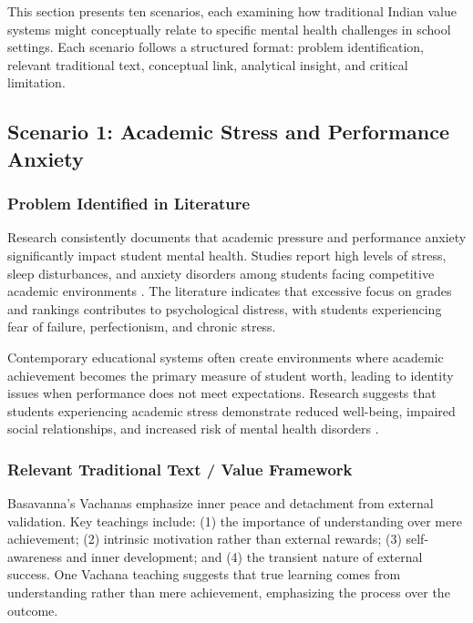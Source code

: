 \documentclass[12pt,a4paper,twocolumn]{article}
\begin{document}
This section presents ten scenarios, each examining how traditional Indian value systems might conceptually relate to specific mental health challenges in school settings. Each scenario follows a structured format: problem identification, relevant traditional text, conceptual link, analytical insight, and critical limitation.

\subsection{Scenario 1: Academic Stress and Performance Anxiety}

\subsubsection{Problem Identified in Literature}

Research consistently documents that academic pressure and performance anxiety significantly impact student mental health. Studies report high levels of stress, sleep disturbances, and anxiety disorders among students facing competitive academic environments \citep{Pandey2019, Sharma2018}. The literature indicates that excessive focus on grades and rankings contributes to psychological distress, with students experiencing fear of failure, perfectionism, and chronic stress.

Contemporary educational systems often create environments where academic achievement becomes the primary measure of student worth, leading to identity issues when performance does not meet expectations. Research suggests that students experiencing academic stress demonstrate reduced well-being, impaired social relationships, and increased risk of mental health disorders \citep{Sharma2018}.

\subsubsection{Relevant Traditional Text / Value Framework}

Basavanna's Vachanas emphasize inner peace and detachment from external validation. Key teachings include: (1) the importance of understanding over mere achievement; (2) intrinsic motivation rather than external rewards; (3) self-awareness and inner development; and (4) the transient nature of external success. One Vachana teaching suggests that true learning comes from understanding rather than mere achievement, emphasizing the process over the outcome.
\end{document}
